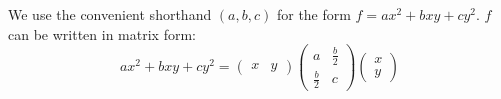 \documentclass{article}
\begin{document}


We use the convenient shorthand $(a,b,c)$ for the form $f=a x^2 + b x y + c y^2$.
$f$ can be written in matrix form:
\begin{equation*}
    a x^2 + b x y + c y^2 =
    \begin{pmatrix}
        x & y
    \end{pmatrix}
    \begin{pmatrix}
        a & \frac{b}{2} \\
        \frac{b}{2} & c
    \end{pmatrix}
    \begin{pmatrix}
        x \\ y
    \end{pmatrix}
\end{equation*}
\end{document}
